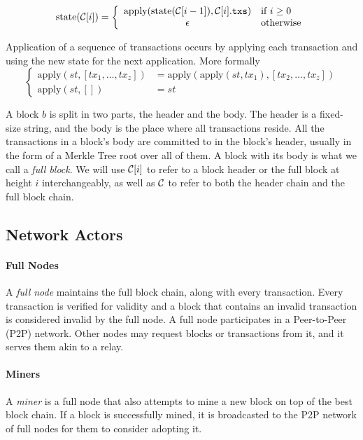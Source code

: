 \[
\text{state}(\mathcal{C}[i]) = \left\{
    \begin{array}{cl}
        \text{apply}(\text{state}(\mathcal{C}[i-1]), \mathcal{C}[i].\texttt{txs}) & \text{if } i \ge 0 \\
        \epsilon & \text{otherwise}
    \end{array}
\right.
\]

Application of a sequence of transactions occurs by applying each transaction and using the new state for the next application. More formally
\[
\left\{
    \begin{array}{rl}
        \text{apply}(st, [tx_1, \dots, tx_z]) &= \text{apply}(\text{apply}(st, tx_1), [tx_2, \dots, tx_z]) \\
        \text{apply}(st, []) &= st
    \end{array}
\right.
\]

A block $b$ is split in two parts, the header and the body. The header is a fixed-size string, and the body is the place where all transactions reside. All the transactions in a block's body are committed to in the block's header, usually in the form of a Merkle Tree root over all of them. A block with its body is what we call a \emph{full block}. We will use $\mathcal{C}[i]$ to refer to a block header or the full block at height $i$ interchangeably, as well as $\mathcal{C}$ to refer to both the header chain and the full block chain.

\subsection{Network Actors}
\paragraph{Full Nodes}
A \emph{full node} maintains the full block chain, along with every transaction. Every transaction is verified for validity and a block that contains an invalid transaction is considered invalid by the full node. A full node participates in a Peer-to-Peer (P2P) network. Other nodes may request blocks or transactions from it, and it serves them akin to a relay.
\paragraph{Miners}
A \emph{miner} is a full node that also attempts to mine a new block on top of the best block chain. If a block is successfully mined, it is broadcasted to the P2P network of full nodes for them to consider adopting it.

